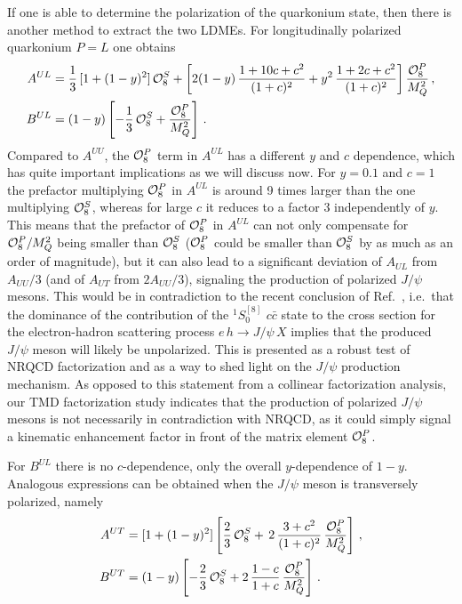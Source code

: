 \documentclass[prd,aps,preprintnumbers,nofootinbib,superscriptaddress]{revtex4}
\begin{document}
If one is able to determine the polarization of the quarkonium state, then there is another method to extract the two LDMEs. For longitudinally polarized quarkonium $P=L$ one obtains 
\begin{align}
A^{UL}
& = \frac{1}{3}\,[1+(1-y)^2] \, {\cal O}_{8}^S +  \left[2(1-y)\,\frac{1+10c+c^2}{(1+c)^2} +  y^2\,\frac{1+2c+c^2}{(1+c)^2} \right] \frac{{\cal O}_{8}^P}{M_{Q}^{2}}   \,, \label{eq:AUL}
\\
B^{UL}
& = (1-y) \left [ -\frac{1}{3}\, {\cal O}_{8}^S + \frac{{\cal O}_{8}^P}{M_Q^2} \right ]\, .
\label{eq:BUL}
\end{align}
Compared to $A^{UU}$, the ${\cal O}_{8}^P$ term in $A^{UL}$ has a different $y$ and $c$ dependence, which has quite important implications as we will discuss now. For $y=0.1$ and $c=1$ the prefactor multiplying ${\cal O}_{8}^P$ in $A^{UL}$ is around 9 times larger than the one multiplying ${\cal O}_{8}^S$, whereas for large $c$ it reduces to a factor 3 independently of $y$. This means that the prefactor of ${\cal O}_{8}^P$ in $A^{UL}$ can not only compensate for ${\cal O}_{8}^P/M_Q^2$ being smaller than ${\cal O}_{8}^S$ (${\cal O}_{8}^P$ could be smaller than ${\cal O}_{8}^S$ by as much as an order of magnitude), but  it can also lead to a significant deviation of $A_{UL}$ from $A_{UU}/3$ (and of $A_{UT}$ from $2A_{UU}/3$), signaling the production of polarized $J/\psi$ mesons. This would be in contradiction to the recent conclusion of Ref.~\cite{Qiu:2020xum},  i.e.\  that the dominance of the contribution of the  ${}^1S_0^{[8]}$ $c\bar{c}$ state to the cross section for the electron-hadron scattering process $e\,h \to J/\psi\, X$ implies that the produced $J/\psi$ meson will likely be unpolarized. This is presented as a robust test of NRQCD factorization and as a way to shed light on the $J/\psi$ production mechanism. As opposed to this statement from a collinear factorization analysis, our TMD factorization study indicates that the production of polarized $J/\psi$ mesons is not necessarily in contradiction with NRQCD, as it could simply signal a kinematic enhancement factor in front of the matrix element ${\cal O}_{8}^P$.

For $B^{UL}$ there is no $c$-dependence, only the overall $y$-dependence of $1-y$. Analogous expressions can be obtained when the $J/\psi$ meson is transversely polarized, namely
\begin{align}
A^{UT} &  = [1+(1-y)^2]  \left [\frac{2}{3} \, {\cal O}_{8}^S + \, 2\,\frac{3+ c^2}{(1+c)^2}\, \frac{{\cal O}_{8}^P}{M_Q^2} \right] \,, \label{eq:AUT}
\\
B^{UT} 
& = (1-y) \left [-\frac{2}{3}\,  {\cal O}_{8}^S +2\, \frac{1-c}{1+c}\, \frac{{\cal O}_{8}^P}{M_Q^2} \right] \, .
\label{eq:BUT}
\end{align}
\end{document}
